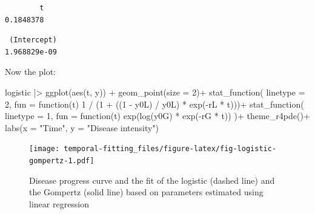 \documentclass[
  letterpaper,
]{book}
\newenvironment{Shaded}{\begin{snugshade}}{\end{snugshade}}
\newcommand{\AttributeTok}[1]{\textcolor[rgb]{0.40,0.45,0.13}{#1}}
\newcommand{\ControlFlowTok}[1]{\textcolor[rgb]{0.00,0.23,0.31}{#1}}
\newcommand{\DecValTok}[1]{\textcolor[rgb]{0.68,0.00,0.00}{#1}}
\newcommand{\FunctionTok}[1]{\textcolor[rgb]{0.28,0.35,0.67}{#1}}
\newcommand{\NormalTok}[1]{\textcolor[rgb]{0.00,0.23,0.31}{#1}}
\newcommand{\OtherTok}[1]{\textcolor[rgb]{0.00,0.23,0.31}{#1}}
\newcommand{\SpecialCharTok}[1]{\textcolor[rgb]{0.37,0.37,0.37}{#1}}
\newcommand{\StringTok}[1]{\textcolor[rgb]{0.13,0.47,0.30}{#1}}
\begin{document}
\begin{verbatim}
        t 
0.1848378 
\end{verbatim}

\begin{Shaded}
\end{Shaded}

\begin{verbatim}
 (Intercept) 
1.968829e-09 
\end{verbatim}

Now the plot:

\begin{Shaded}
\begin{Highlighting}[]
\NormalTok{logistic }\SpecialCharTok{|\textgreater{}}
  \FunctionTok{ggplot}\NormalTok{(}\FunctionTok{aes}\NormalTok{(t, y)) }\SpecialCharTok{+}
  \FunctionTok{geom\_point}\NormalTok{(}\AttributeTok{size =} \DecValTok{2}\NormalTok{)}\SpecialCharTok{+}
  \FunctionTok{stat\_function}\NormalTok{(}
    \AttributeTok{linetype =} \DecValTok{2}\NormalTok{,}
    \AttributeTok{fun =} \ControlFlowTok{function}\NormalTok{(t) }\DecValTok{1} \SpecialCharTok{/}\NormalTok{ (}\DecValTok{1} \SpecialCharTok{+}\NormalTok{ ((}\DecValTok{1} \SpecialCharTok{{-}}\NormalTok{ y0L) }\SpecialCharTok{/}\NormalTok{ y0L) }\SpecialCharTok{*} \FunctionTok{exp}\NormalTok{(}\SpecialCharTok{{-}}\NormalTok{rL }\SpecialCharTok{*}\NormalTok{ t)))}\SpecialCharTok{+}
\FunctionTok{stat\_function}\NormalTok{(}
    \AttributeTok{linetype =} \DecValTok{1}\NormalTok{,}
    \AttributeTok{fun =} \ControlFlowTok{function}\NormalTok{(t) }\FunctionTok{exp}\NormalTok{(}\FunctionTok{log}\NormalTok{(y0G) }\SpecialCharTok{*} \FunctionTok{exp}\NormalTok{(}\SpecialCharTok{{-}}\NormalTok{rG }\SpecialCharTok{*}\NormalTok{ t))}
\NormalTok{  )}\SpecialCharTok{+}
  \FunctionTok{theme\_r4pde}\NormalTok{()}\SpecialCharTok{+}
  \FunctionTok{labs}\NormalTok{(}\AttributeTok{x =} \StringTok{"Time"}\NormalTok{, }\AttributeTok{y =} \StringTok{"Disease intensity"}\NormalTok{)}
\end{Highlighting}
\end{Shaded}

\begin{figure}

\texttt{[image: temporal-fitting\_files/figure-latex/fig-logistic-gompertz-1.pdf]} \hfill{}

\caption{\label{fig-logistic-gompertz}Disease progress curve and the fit
of the logistic (dashed line) and the Gompertz (solid line) based on
parameters estimated using linear regression}

\end{figure}
\end{document}
